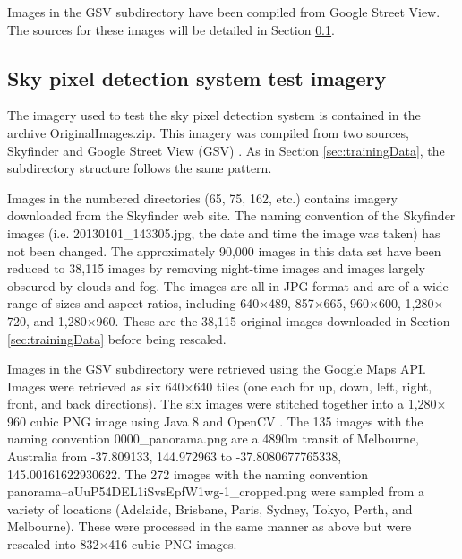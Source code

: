 \documentclass[final,3p,times,authoryear]{elsarticle}
\begin{document}
Images in the GSV subdirectory have been compiled from Google Street View. The sources for these images will be detailed in Section \ref{sec:origImages}.

\subsection{Sky pixel detection system test imagery}\label{sec:origImages}
The imagery used to test the \cite{Nice2019UC} sky pixel detection system is contained in the archive OriginalImages.zip. This imagery was compiled from two sources, Skyfinder \citep{Mihail2016} and Google Street View (GSV) \citep{GoogleMaps2017b}. As in Section \ref{sec:trainingData}, the subdirectory structure follows the same pattern. 

Images in the numbered directories (65, 75, 162, etc.) contains imagery downloaded from the Skyfinder web site. The naming convention of the Skyfinder images (i.e. 20130101\_143305.jpg, the date and time the image was taken) has not been changed. The approximately 90,000 images in this data set have been reduced to 38,115 images by removing night-time images and images largely obscured by clouds and fog. The images are all in JPG format and are of a wide range of sizes and aspect ratios, including 640$\times$489, 857$\times$665, 960$\times$600, 1,280$\times$720, and 1,280$\times$960. These are the 38,115 original images downloaded in Section \ref{sec:trainingData} before being rescaled.

Images in the GSV subdirectory were retrieved using the Google Maps API. Images were retrieved as six 640$\times$640 tiles (one each for up, down, left, right, front, and back directions). The six images were stitched together into a 1,280$\times$960 cubic PNG image using Java 8 \citep{Oracle2018} and OpenCV \citep {Bradski2000}. The 135 images with the naming convention 0000\_panorama.png are a 4890m transit of Melbourne, Australia from -37.809133, 144.972963 to -37.8080677765338, 145.00161622930622. The 272 images with the naming convention \\ panorama--aUuP54DEL1iSvsEpfW1wg-1\_cropped.png were sampled from a variety of locations (Adelaide, Brisbane, Paris, Sydney, Tokyo, Perth, and Melbourne). These were processed in the same manner as above but were rescaled into 832$\times$416 cubic PNG images.


\end{document}
